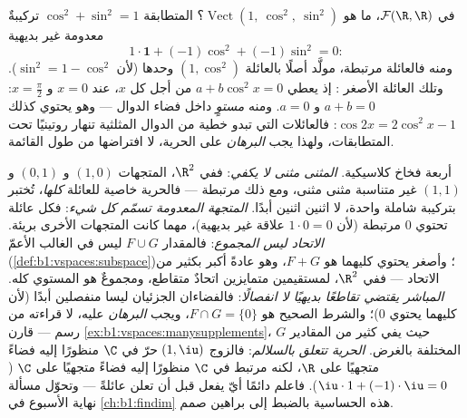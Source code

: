 \begin{example}
\label{ex:b1:vspaces:hiddenrelation}
في $\mathcal{F}(\R, \R)$، ما هو
$\operatorname{Vect}(1,\ \cos^2,\ \sin^2)$؟ المتطابقة
$\cos^2 + \sin^2 = 1$ تركيبةٌ معدومة غير بديهية
\[
1\cdot\mathbf{1} + (-1)\cos^2 + (-1)\sin^2 = 0 :
\]
ومنه فالعائلة مرتبطة،  مولَّد أصلًا
بالعائلة $(1, \cos^2)$ وحدها (لأن $\sin^2 = 1 - \cos^2$). وتلك العائلة الأصغر
: إذ يعطي $a + b\cos^2 x = 0$ من أجل كل $x$، عند $x = 0$ و
$x = \frac\pi2$: $a + b = 0$ و $a = 0$. ومنه 
\emph{مستوٍ} داخل فضاء الدوال --- وهو يحتوي كذلك
$\cos 2x = 2\cos^2 x - 1$: فالعائلات التي تبدو خطية من
الدوال المثلثية تنهار روتينيًا تحت المتطابقات،
ولهذا يجب \emph{البرهان} على الحرية، لا افتراضها من
طول القائمة.
\end{example}

\begin{remark}
\label{rem:b1:vspaces:pitfalls}
أربعة فخاخ كلاسيكية.
\emph{المثنى مثنى لا يكفي}: ففي $\R^2$، المتجهات $(1,0)$
و $(0,1)$ و $(1,1)$ غير متناسبة مثنى مثنى، ومع ذلك مرتبطة ---
فالحرية خاصية للعائلة \emph{كلها}، تُختبر بتركيبة
شاملة واحدة، لا اثنين اثنين أبدًا.
\emph{المتجهة المعدومة تسمّم كل شيء}: فكل عائلة تحتوي
$0$ مرتبطة (لأن $1\cdot 0 = 0$ علاقة غير بديهية)، مهما كانت
المتجهات الأخرى بريئة.
\emph{الاتحاد ليس المجموع}: فالمقدار $F \cup G$ ليس  في الغالب الأعمّ
(\cref{def:b1:vspaces:subspace})؛ وأصغر 
يحتوي كليهما هو $F + G$، وهو عادةً أكبر بكثير من الاتحاد
--- ففي $\R^2$، لمستقيمين متمايزين اتحادٌ متقاطع، ومجموعٌ هو
المستوي كله.
\emph{المباشر يقتضي تقاطعًا بديهيًا لا انفصالًا}:
فالفضاءان الجزئيان ليسا منفصلين أبدًا (لأن كليهما يحتوي $0$)؛ والشرط
الصحيح هو $F \cap G = \{0\}$، ويجب \emph{البرهان} عليه،
لا قراءته من رسم --- قارن
\cref{ex:b1:vspaces:manysupplements}، حيث يفي كثير من المقادير $G$ المختلفة بالغرض.
\emph{الحرية تتعلق بالسلالم}: فالزوج $(1, \iu)$
حرّ في $\C$ منظورًا إليه فضاءً متجهيًا على $\R$، لكنه مرتبط في $\C$
منظورًا إليه فضاءً متجهيًا على $\C$ ($\iu\cdot 1 + (-1)\cdot\iu = 0$).
فاعلم دائمًا أيّ  يفعل قبل أن تعلن عائلةً 
--- وتحوّل مسألة نهاية الأسبوع في \cref{ch:b1:findim} هذه
الحساسية بالضبط إلى براهين صمم.
\end{remark}

